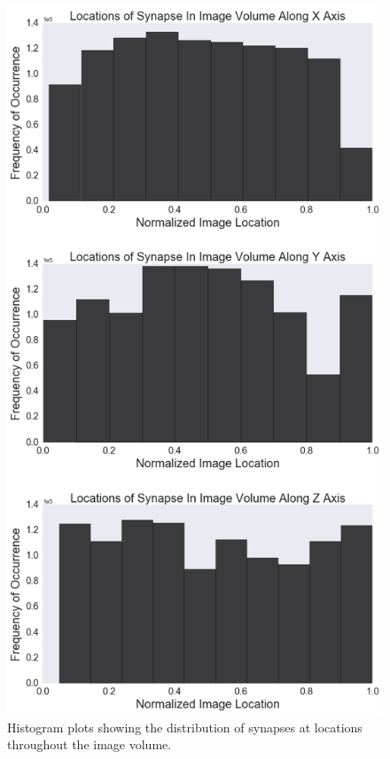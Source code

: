 \documentclass{article}
\begin{document}
\begin{figure}
  \centering 
  \includegraphics[scale=0.5]{figures/locationshist.png}
  \caption{Histogram plots showing the distribution of synapses at locations throughout the image volume.}
  \label{fig:figure3}
\end{figure}
\end{document}
